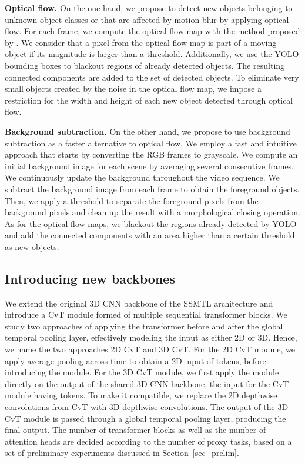 \documentclass[times,twocolumn,final,authoryear]{elsarticle}
\begin{document}
\noindent
{\bf Optical flow.}
On the one hand, we propose to detect new objects belonging to unknown object classes or that are affected by motion blur by applying optical flow. For each frame, we compute the optical flow map with the method proposed by \cite{Liu-CVPR-2019}. We consider that a pixel from the optical flow map is part of a moving object if its magnitude is larger than a threshold. Additionally, we use the YOLO bounding boxes to blackout regions of already detected objects. The resulting connected components are added to the set of detected objects. To eliminate very small objects created by the noise in the optical flow map, we impose a restriction for the width and height of each new object detected through optical flow.

\noindent
{\bf Background subtraction.}
On the other hand, we propose to use background subtraction as a faster alternative to optical flow. We employ a fast and intuitive approach that starts by converting the RGB frames to grayscale. We compute an initial background image for each scene by averaging several consecutive frames. We continuously update the background throughout the video sequence. We subtract the background image from each frame to obtain the foreground objects. Then, we apply a threshold to separate the foreground pixels from the background pixels and clean up the result with a morphological closing operation. As for the optical flow maps, we blackout the regions already detected by YOLO and add the connected components with an area higher than a certain threshold as new objects. 

\subsection{Introducing new backbones}


We extend the original 3D CNN backbone of the SSMTL architecture and introduce a CvT \citep{Wu-ICCV-2021} module formed of multiple sequential transformer blocks. We study two approaches of applying the transformer before and after the global temporal pooling layer, effectively modeling the input as either 2D or 3D. Hence, we name the two approaches 2D CvT and 3D CvT. For the 2D CvT module, we apply average pooling across time to obtain a 2D input of  tokens, before introducing the module. For the 3D CvT module, we first apply the module directly on the output of the shared 3D CNN backbone, the input for the CvT module having  tokens. To make it compatible, we replace the 2D depthwise convolutions from CvT with 3D depthwise convolutions. The output of the 3D CvT module is passed through a global temporal pooling layer, producing the final output. The number of transformer blocks  as well as the number of attention heads  are decided according to the number of proxy tasks, based on a set of preliminary experiments discussed in Section~\ref{sec_prelim}.
\end{document}
